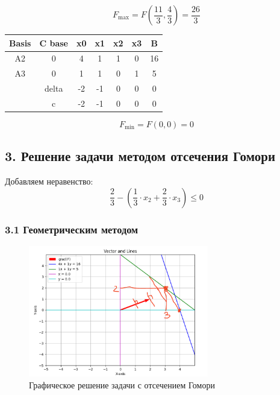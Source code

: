 \documentclass[17pt]{extarticle}
\begin{document}
\[
    F_{\text{max}} = F\left(\frac{11}{3}, \frac{4}{3}\right) = \frac{26}{3}
\]

\begin{table}[H]
    \centering
    \begin{tabular}{c|c|cccc|c}
        \toprule
        Basis & C base & x0 & x1 & x2 & x3 & B  \\
        \midrule
        A2    & 0      & 4  & 1  & 1  & 0  & 16 \\
        A3    & 0      & 1  & 1  & 0  & 1  & 5  \\
        \midrule
              & delta  & -2 & -1 & 0  & 0  & 0  \\
              & c      & -2 & -1 & 0  & 0  & 0  \\
        \bottomrule
    \end{tabular}
\end{table}

\[
    F_{\text{min}} = F(0, 0) = 0
\]

\subsection*{3. Решение задачи методом отсечения Гомори}

Добавляем неравенство:
\[
    \frac{2}{3} - \left(\frac{1}{3} \cdot x_2 + \frac{2}{3} \cdot x_3\right) \leq 0
\]

\subsubsection*{3.1 Геометрическим методом}

\begin{figure}[H]
    \centering
    \includegraphics[width=0.7\textwidth]{2.png}
    \caption{Графическое решение задачи с отсечением Гомори}
\end{figure}
\end{document}

